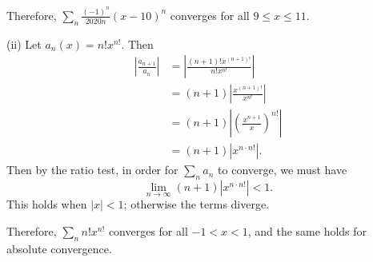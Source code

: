 \documentclass{article}
\begin{document}
Therefore, $\sum_n \frac{(-1)^n}{2020n}(x-10)^n$ converges for all $9 \leq x \leq 11$.

(ii) Let $a_n(x) = n! x^{n!}$. Then
\begin{align}
	\left|\frac{a_{n+1}}{a_n}\right| &= \left|\frac{(n+1)! x^{(n+1)!}}{n!x^{n!}}\right| \\
	&= (n+1)\left|\frac{x^{(n+1)!}}{x^{n!}}\right| \\
	&= (n+1) \left|\left(\frac{x^{n+1}}{x}\right)^{n!}\right| \\
	&= (n+1) \left|x^{n\cdot n!}\right|.
\end{align}
Then by the ratio test, in order for $\sum_n a_n$ to converge, we must have
\begin{equation}
	\lim_{n \to \infty} (n+1) \left|x^{n\cdot n!}\right| < 1.
\end{equation}
This holds when $|x| < 1$; otherwise the terms diverge. 

Therefore, $\sum_n n! x^{n!}$ converges for all $-1 < x < 1$, and the same holds for absolute convergence.
\end{document}
